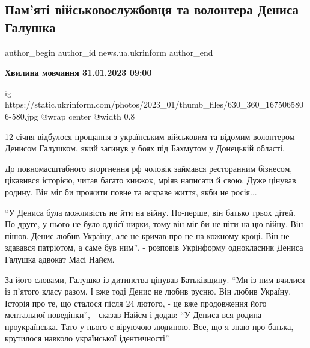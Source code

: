  
 
 
 
 
 
\subsection{Пам'яті військовослужбовця та волонтера Дениса Галушка}
\label{sec:12_01_2023.stz.news.ua.ukrinform.1.pamjati_denisa_galushko}
 
\ifcmt
 author_begin
   author_id news.ua.ukrinform
 author_end
\fi

\textbf{Хвилина мовчання 31.01.2023 09:00}

\ifcmt
	ig https://static.ukrinform.com/photos/2023_01/thumb_files/630_360_1675065806-580.jpg
	@wrap center
	@width 0.8
\fi

12 січня відбулося прощання з українським військовим та відомим волонтером
Денисом Галушком, який загинув у боях під Бахмутом у Донецькій області.

До повномасштабного вторгнення рф чоловік займався ресторанним бізнесом,
цікавився історією, читав багато книжок, мріяв написати й свою. Дуже цінував
родину. Він міг би прожити повне та яскраве життя, якби не росія...

\enquote{У Дениса була можливість не йти на війну. По-перше, він батько трьох дітей.
По-друге, у нього не було однієї нирки, тому він міг би не піти на цю війну.
Він пішов. Денис любив Україну, але не кричав про це на кожному кроці. Він не
здавався патріотом, а саме був ним}, - розповів Укрінформу однокласник Дениса
Галушка адвокат Масі Найєм.


За його словами, Галушко із дитинства цінував Батьківщину. \enquote{Ми із ним вчилися
із п'ятого класу разом. І вже тоді Денис не любив русню. Він любив Україну.
Історія про те, що сталося після 24 лютого, - це вже продовження його
ментальної поведінки}, - сказав Найєм і додав: \enquote{У Дениса вся родина
проукраїнська. Тато у нього є віруючою людиною. Все, що я знаю про батька,
крутилося навколо української ідентичності}.

